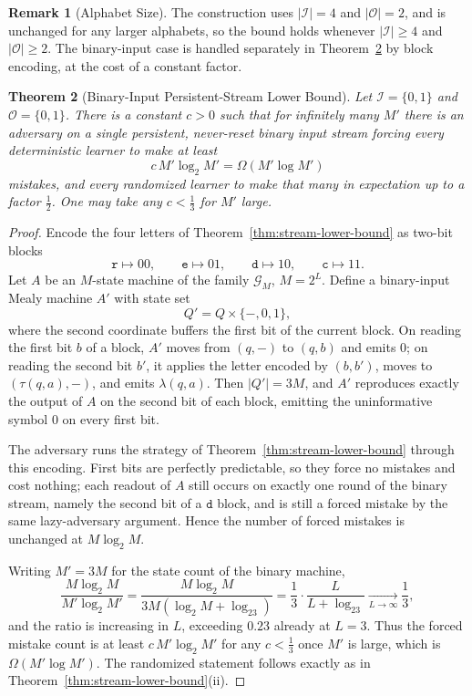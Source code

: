 \documentclass[12pt]{article}
\newtheorem{theorem}{Theorem}[section]
\theoremstyle{definition}
\newtheorem{remark}[theorem]{Remark}
\begin{document}
\begin{remark}[Alphabet Size]
\label{rem:stream-lb-alphabet}
The construction uses $|\mathcal I|=4$ and $|\mathcal O|=2$, and is unchanged
for any larger alphabets, so the bound holds whenever $|\mathcal I|\ge4$ and
$|\mathcal O|\ge2$.  The binary-input case is handled separately in
Theorem~\ref{thm:stream-lb-binary} by block encoding, at the cost of a
constant factor.
\end{remark}

\begin{theorem}[Binary-Input Persistent-Stream Lower Bound]
\label{thm:stream-lb-binary}
Let $\mathcal I=\{0,1\}$ and $\mathcal O=\{0,1\}$.  There is a constant
$c>0$ such that for infinitely many $M'$ there is an adversary on a single
persistent, never-reset binary input stream forcing every deterministic
learner to make at least
\[
c\,M'\log_2M'
=
\Omega(M'\log M')
\]
mistakes, and every randomized learner to make that many in expectation up to
a factor $\tfrac12$.  One may take any $c<\tfrac13$ for $M'$ large.
\end{theorem}

\begin{proof}
Encode the four letters of Theorem~\ref{thm:stream-lower-bound} as two-bit
blocks
\[
\mathtt r\mapsto00,\qquad
\mathtt e\mapsto01,\qquad
\mathtt d\mapsto10,\qquad
\mathtt c\mapsto11 .
\]
Let $A$ be an $M$-state machine of the family $\mathcal G_M$, $M=2^L$.  Define
a binary-input Mealy machine $A'$ with state set
\[
Q'=Q\times\{-,0,1\},
\]
where the second coordinate buffers the first bit of the current block.  On
reading the first bit $b$ of a block, $A'$ moves from $(q,-)$ to $(q,b)$ and
emits $0$; on reading the second bit $b'$, it applies the letter encoded by
$(b,b')$, moves to $(\tau(q,a),-)$, and emits $\lambda(q,a)$.  Then
$|Q'|=3M$, and $A'$ reproduces exactly the output of $A$ on the second bit of
each block, emitting the uninformative symbol $0$ on every first bit.

The adversary runs the strategy of Theorem~\ref{thm:stream-lower-bound}
through this encoding.  First bits are perfectly predictable, so they force no
mistakes and cost nothing; each readout of $A$ still occurs on exactly one
round of the binary stream, namely the second bit of a $\mathtt d$ block, and
is still a forced mistake by the same lazy-adversary argument.  Hence the
number of forced mistakes is unchanged at $M\log_2M$.

Writing $M'=3M$ for the state count of the binary machine,
\[
\frac{M\log_2M}{M'\log_2M'}
=
\frac{M\log_2M}{3M(\log_2M+\log_23)}
=
\frac13\cdot\frac{L}{L+\log_23}
\xrightarrow[L\to\infty]{}
\frac13 ,
\]
and the ratio is increasing in $L$, exceeding $0.23$ already at $L=3$.  Thus
the forced mistake count is at least $c\,M'\log_2M'$ for any $c<\tfrac13$ once
$M'$ is large, which is $\Omega(M'\log M')$.  The randomized statement follows
exactly as in Theorem~\ref{thm:stream-lower-bound}(ii).
\end{proof}
\end{document}
